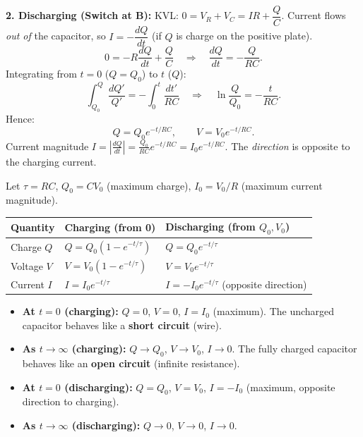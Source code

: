 \documentclass[11pt]{article}
\begin{document}
\textbf{2. Discharging (Switch at B):}
KVL: $0 = V_R + V_C = IR + \dfrac{Q}{C}$. Current flows \emph{out of} the capacitor, so $I = -\dfrac{dQ}{dt}$ (if $Q$ is charge on the positive plate).
\[
0 = -R \frac{dQ}{dt} + \frac{Q}{C} \quad \Rightarrow \quad \frac{dQ}{dt} = -\frac{Q}{RC}.
\]
Integrating from $t=0$ ($Q=Q_0$) to $t$ ($Q$):
\[
\int_{Q_0}^Q \frac{dQ'}{Q'} = -\int_0^t \frac{dt'}{RC} \quad \Rightarrow \quad \ln\frac{Q}{Q_0} = -\frac{t}{RC}.
\]
Hence:
\[
Q = Q_0 e^{-t/RC}, \qquad V = V_0 e^{-t/RC}.
\]
Current magnitude $I = \left|\frac{dQ}{dt}\right| = \frac{Q_0}{RC}e^{-t/RC} = I_0 e^{-t/RC}$. The \emph{direction} is opposite to the charging current.

\begin{propriete}
Let $\tau = RC$, $Q_0 = CV_0$ (maximum charge), $I_0 = V_0/R$ (maximum current magnitude).
\begin{center}
\begin{tabularx}{\linewidth}{|l|X|X|}\hline
\rowcolor{popblueL}
\textbf{Quantity} & \textbf{Charging (from 0)} & \textbf{Discharging (from $Q_0, V_0$)} \\ \hline
Charge $Q$ & $Q = Q_0 (1 - e^{-t/\tau})$ & $Q = Q_0 e^{-t/\tau}$ \\ \hline
Voltage $V$ & $V = V_0 (1 - e^{-t/\tau})$ & $V = V_0 e^{-t/\tau}$ \\ \hline
Current $I$ & $I = I_0 e^{-t/\tau}$ & $I = -I_0 e^{-t/\tau}$ (opposite direction) \\ \hline
\end{tabularx}
\end{center}
\end{propriete}

\begin{propriete}
\begin{itemize}
    \item \textbf{At $t=0$ (charging):} $Q=0$, $V=0$, $I=I_0$ (maximum). The uncharged capacitor behaves like a \textbf{short circuit} (wire).
    \item \textbf{As $t \to \infty$ (charging):} $Q \to Q_0$, $V \to V_0$, $I \to 0$. The fully charged capacitor behaves like an \textbf{open circuit} (infinite resistance).
    \item \textbf{At $t=0$ (discharging):} $Q=Q_0$, $V=V_0$, $I=-I_0$ (maximum, opposite direction to charging).
    \item \textbf{As $t \to \infty$ (discharging):} $Q \to 0$, $V \to 0$, $I \to 0$.
\end{itemize}
\end{propriete}
\end{document}
